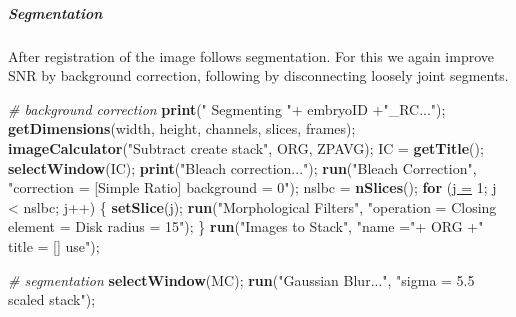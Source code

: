 \documentclass[11pt,singlespacinge,twoside]{reedthesis} %
\newenvironment{Shaded}{}{}
\newcommand{\CommentTok}[1]{\textit{#1}}
\newcommand{\ControlFlowTok}[1]{\textbf{#1}}
\newcommand{\DataTypeTok}[1]{\underline{#1}}
\newcommand{\DecValTok}[1]{#1}
\newcommand{\KeywordTok}[1]{\textbf{#1}}
\newcommand{\NormalTok}[1]{#1}
\newcommand{\OperatorTok}[1]{#1}
\newcommand{\StringTok}[1]{#1}
\theoremstyle{definition}
\theoremstyle{definition}
\theoremstyle{definition}
\theoremstyle{remark}
\begin{document}
\hypertarget{segmentation-1}{%
\subparagraph{Segmentation}\label{segmentation-1}}

After registration of the image follows segmentation. For this we again improve SNR by background correction, following by disconnecting loosely joint segments.

\scriptsize
\begin{Shaded}
\begin{Highlighting}[numbers=left,,]
\CommentTok{#  background correction}
    \KeywordTok{print}\NormalTok{(}\StringTok{"  Segmenting "}\OperatorTok{+}\StringTok{ }\NormalTok{embryoID }\OperatorTok{+}\StringTok{"_RC..."}\NormalTok{);}
        \KeywordTok{getDimensions}\NormalTok{(width, height, channels, slices, frames);}
        \KeywordTok{imageCalculator}\NormalTok{(}\StringTok{"Subtract create stack"}\NormalTok{, ORG, ZPAVG);}
\NormalTok{        IC =}\StringTok{ }\KeywordTok{getTitle}\NormalTok{();}
    \KeywordTok{selectWindow}\NormalTok{(IC);}
        \KeywordTok{print}\NormalTok{(}\StringTok{"Bleach correction..."}\NormalTok{);}
        \KeywordTok{run}\NormalTok{(}\StringTok{"Bleach Correction"}\NormalTok{, }
            \StringTok{"correction = [Simple Ratio] background = 0"}\NormalTok{);}
\NormalTok{        nslbc =}\StringTok{ }\KeywordTok{nSlices}\NormalTok{();}
        \ControlFlowTok{for}\NormalTok{ (}\DataTypeTok{j =} \DecValTok{1}\NormalTok{; j }\OperatorTok{<}\StringTok{ }\NormalTok{nslbc; j}\OperatorTok{++}\NormalTok{) \{}
            \KeywordTok{setSlice}\NormalTok{(j);}
            \KeywordTok{run}\NormalTok{(}\StringTok{"Morphological Filters"}\NormalTok{,}
                \StringTok{"operation = Closing element = Disk radius = 15"}\NormalTok{);}
\NormalTok{        \}}
        \KeywordTok{run}\NormalTok{(}\StringTok{"Images to Stack"}\NormalTok{, }\StringTok{"name ="}\OperatorTok{+}\StringTok{ }\NormalTok{ORG }\OperatorTok{+}\StringTok{" title = [] use"}\NormalTok{);}
        
    \CommentTok{#   segmentation}
        \KeywordTok{selectWindow}\NormalTok{(MC);}
        \KeywordTok{run}\NormalTok{(}\StringTok{"Gaussian Blur..."}\NormalTok{, }\StringTok{"sigma = 5.5 scaled stack"}\NormalTok{);}
        

\end{Highlighting}
\end{Shaded}
\end{document}
